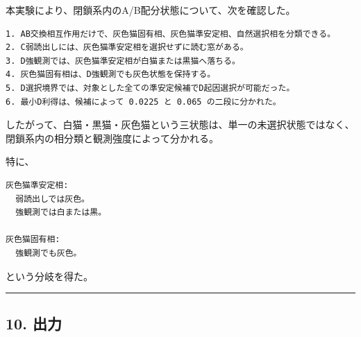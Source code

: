\documentclass{article}
\begin{document}
本実験により、閉鎖系内のA/B配分状態について、次を確認した。

\begin{verbatim}
1. AB交換相互作用だけで、灰色猫固有相、灰色猫準安定相、自然選択相を分類できる。
2. C弱読出しには、灰色猫準安定相を選択せずに読む窓がある。
3. D強観測では、灰色猫準安定相が白猫または黒猫へ落ちる。
4. 灰色猫固有相は、D強観測でも灰色状態を保持する。
5. D選択境界では、対象とした全ての準安定候補でD起因選択が可能だった。
6. 最小D利得は、候補によって 0.0225 と 0.065 の二段に分かれた。
\end{verbatim}

したがって、白猫・黒猫・灰色猫という三状態は、単一の未選択状態ではなく、閉鎖系内の相分類と観測強度によって分かれる。

特に、

\begin{verbatim}
灰色猫準安定相:
  弱読出しでは灰色。
  強観測では白または黒。

灰色猫固有相:
  強観測でも灰色。
\end{verbatim}

という分岐を得た。

\begin{center}\rule{0.5\linewidth}{0.5pt}\end{center}

\subsection{10. 出力}\label{ux51faux529b}
\end{document}
